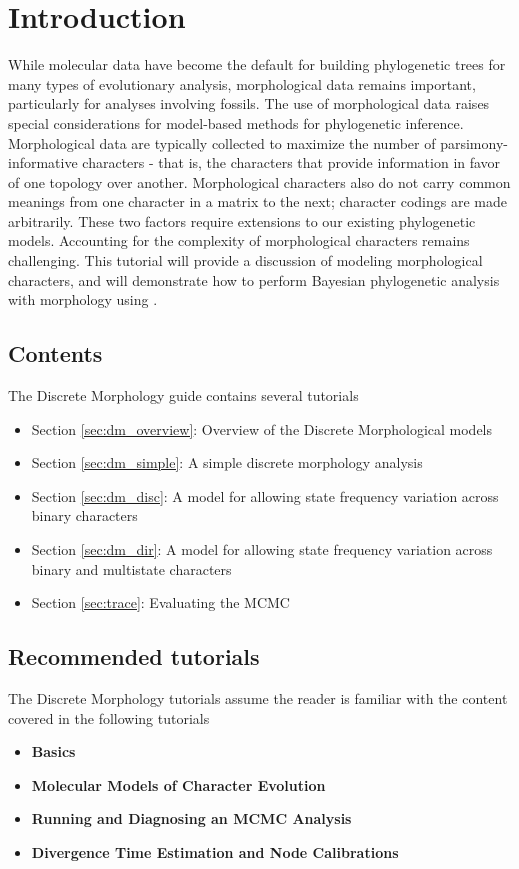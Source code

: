 \section{Introduction}

While molecular data have become the default for building phylogenetic trees for many types of evolutionary analysis, morphological data remains important, particularly for analyses involving fossils. The use of morphological data  raises special considerations for model-based methods for phylogenetic inference. Morphological data are typically collected to maximize the number of parsimony-informative characters -  that is, the characters that provide information in favor of one topology over another.  Morphological characters also do not carry common meanings from one character in a matrix to the next; character codings are made arbitrarily. These two factors require extensions to our existing phylogenetic models. Accounting for the complexity of morphological characters remains challenging. This tutorial will provide a discussion of modeling morphological characters, and will demonstrate how to perform Bayesian phylogenetic analysis with morphology using \RevBayes \citep{Hoehna2016b}. 

\subsection{Contents}

The Discrete Morphology guide contains several tutorials

\begin{itemize}
\item Section \ref{sec:dm_overview}: Overview of the Discrete Morphological models
\item Section \ref{sec:dm_simple}: A simple discrete morphology analysis
\item Section \ref{sec:dm_disc}: A model for allowing state frequency variation across binary characters
\item Section \ref{sec:dm_dir}: A model for allowing state frequency variation across binary and multistate characters
\item Section \ref{sec:trace}: Evaluating the MCMC \end{itemize}

\subsection{Recommended tutorials}

The Discrete Morphology tutorials assume the reader is familiar with the content covered in the following \RevBayes tutorials

\begin{itemize}
\item {\bf \Rev Basics}
\item {\bf Molecular Models of Character Evolution}
\item {\bf Running and Diagnosing an MCMC Analysis}
\item {\bf Divergence Time Estimation and Node Calibrations}
\end{itemize}

\newpage
